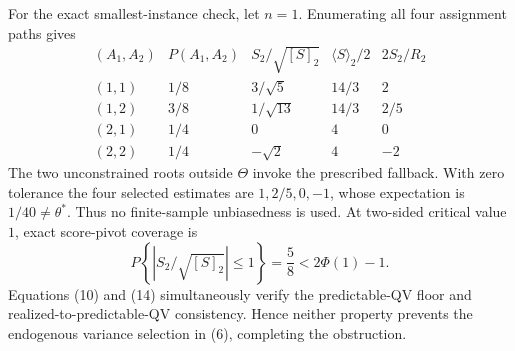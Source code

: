 For the exact smallest-instance check, let \(n=1\).  Enumerating all four assignment paths gives
\[
\begin{array}{c|c|c|c|c}
(A_1,A_2)&P(A_1,A_2)&S_2/\sqrt{[S]_2}&\langle S\rangle_2/2&2S_2/R_2\\ \hline
(1,1)&1/8&3/\sqrt5&14/3&2\\
(1,2)&3/8&1/\sqrt{13}&14/3&2/5\\
(2,1)&1/4&0&4&0\\
(2,2)&1/4&-\sqrt2&4&-2
\end{array}
\tag{28}
\]
The two unconstrained roots outside \(\Theta\) invoke the prescribed fallback.  With zero tolerance the four selected estimates are \(1,2/5,0,-1\), whose expectation is \(1/40\ne\theta^*\).  Thus no finite-sample unbiasedness is used.  At two-sided critical value \(1\), exact score-pivot coverage is
\[
P\!\left\{\left|S_2/\sqrt{[S]_2}\right|\le1\right\}
=\frac58<2\Phi(1)-1.
\tag{29}
\]
Equations (10) and (14) simultaneously verify the predictable-QV floor and realized-to-predictable-QV consistency.  Hence neither property prevents the endogenous variance selection in (6), completing the obstruction.